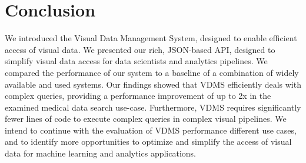 \section{Conclusion}

We introduced the Visual Data Management System,
designed to enable efficient access of visual data.
We presented our rich, JSON-based API, designed to simplify visual data access
for data scientists and analytics pipelines.
We compared the performance of our system to a
baseline of a combination of widely available and used systems.
Our findings showed that VDMS efficiently deals with complex queries,
providing a performance improvement
of up to 2x in the examined medical data search use-case.
Furthermore, VDMS requires significantly fewer
lines of code to execute complex queries in complex visual pipelines.
We intend to continue with the evaluation of
VDMS performance different use cases, and to identify more
opportunities to optimize and simplify the access of visual data
for machine learning and analytics applications.

